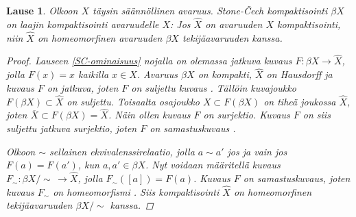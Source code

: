 \documentclass[12pt,a4paper,leqno]{report}
\theoremstyle{plain}
\newtheorem{lause}[equation]{Lause}
\theoremstyle{definition}
\theoremstyle{remark}
\begin{document}
\begin{lause}
Olkoon $X$ täysin säännöllinen avaruus. 
Stone-Čech kompaktisointi $\beta X$ on laajin 
kompaktisointi avaruudelle $X$: 
Jos $\hat{X}$ on avaruuden $X$ kompaktisointi, 
niin $\hat{X}$ on homeomorfinen avaruuden $\beta X$ tekijäavaruuden kanssa. 
\begin{proof}
Lauseen \ref{SC-ominaisuus} nojalla on olemassa 
jatkuva kuvaus $F\colon \beta X\rightarrow \hat{X}$, 
jolla $F(x)=x$ kaikilla $x\in X$. 
Avaruus $\beta X$ on kompakti, $\hat{X}$ on Hausdorff ja kuvaus $F$ on jatkuva, joten $F$ on suljettu kuvaus \cite[lause~15.15]{Topo2}.
Tällöin kuvajoukko $F(\beta X)\subset\hat{X}$ on suljettu. 
Toisaalta osajoukko $X\subset F(\beta X)$ on tiheä joukossa $\hat{X}$, 
joten $\overline{X}\subset F(\beta X) = \hat{X}$. 
Näin ollen kuvaus $F$ on surjektio. 
Kuvaus $F$ on siis suljettu jatkuva surjektio, 
joten $F$ on samastuskuvaus \cite[lause~8.9]{Topo2}. 

Olkoon $\sim$ sellainen ekvivalenssirelaatio, jolla $a\sim a'$ jos ja vain jos $F(a)=F(a')$, kun $a,a'\in \beta X$. 
Nyt voidaan määritellä kuvaus 
$F_{\sim}\colon \beta X /\sim\,\rightarrow \hat{X}$, jolla $F_{\sim}([a])=F(a)$. 
%
%
Kuvaus $F$ on samastuskuvaus, joten kuvaus $F_{\sim}$ %
on homeomorfismi \cite[lause~9.10]{Topo2}.
Siis kompaktisointi $\hat{X}$ on homeomorfinen tekijäavaruuden 
$\beta X / \sim$ kanssa. 
\end{proof}
\end{lause}
\end{document}
